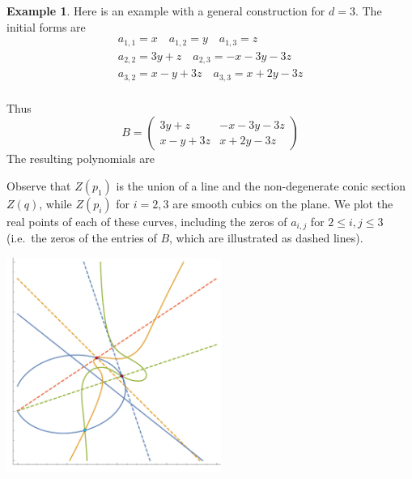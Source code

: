\documentclass[a4paper,11pt]{amsart}%
\newcommand{\vSpace}{\vspace{5mm}\noindent}
\newcommand\pmat[1]{\begin{pmatrix} #1 \end{pmatrix}}
\theoremstyle{definition}
\newtheorem{exam}[theorem]{Example}
\begin{document}
\begin{exam}\label{gconst_deg3}
Here is an example with a general construction for $d=3$. The initial forms are 
\begin{align*}
a_{1,1}=x \quad a_{1,2}=y \quad a_{1,3}=z  \\
a_{2,2}=3y+z \quad a_{2,3}=-x-3y-3z  \\
a_{3,2}=x-y+3z \quad a_{3,3}=x+2y-3z \\
\end{align*}

Thus 
$$
B = \pmat{3y+z& -x-3y-3z\\ x-y+3z& x+2y-3z} 
$$
The resulting polynomials are


\vSpace
Observe that $Z(p_1)$ is the union of a line and the non-degenerate conic section $Z(q)$, while  $Z(p_i)$ for $i=2,3$ 
are smooth cubics on the 
plane. We plot the real points of each of these 
curves, including the zeros of $a_{i,j}$ for $2\le i,j \le 3$ (i.e.\ the zeros of the entries of $B$, which are illustrated as dashed lines).
\newpage

\begin{center}
\includegraphics[width=7cm]{degree_3_example.pdf}
\end{center}


\end{exam}
\end{document}
